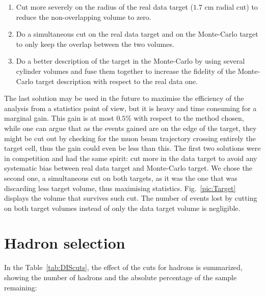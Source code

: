 \begin{enumerate}
  \item Cut more severely on the radius of the real data target ($1.7$ cm radial cut) to reduce the non-overlapping volume to zero.
  \item Do a simultaneous cut on the real data target and on the Monte-Carlo target to only keep the overlap between the two volumes.
  \item Do a better description of the target in the Monte-Carlo by using several cylinder volumes and fuse them together to increase the fidelity of the Monte-Carlo target description with respect to the real data one.
\end{enumerate}

The last solution may be used in the future to maximise the efficiency of the analysis from a statistics point of view, but it is heavy and time consuming for a marginal gain. This gain is at most $0.5$\% with respect to the method chosen, while one can argue that as the events gained are on the edge of the target, they might be cut out by checking for the muon beam trajectory crossing entirely the target cell, thus the gain could even be less than this.
The first two solutions were in competition and had the same spirit: cut more in the data target to avoid any systematic bias between real data target and Monte-Carlo target. We chose the second one, a simultaneous cut on both targets, as it was the one that was discarding less target volume, thus maximising statistics. Fig.~\ref{pic:Target} displays the volume that survives such cut. The number of events lost by cutting on both target volumes instead of only the data target volume is negligible.


\section{Hadron selection}\label{sec:hadsel}

In the Table~\ref{tab:DIScuts}, the effect of the cuts for hadrons is summarized, showing the number of hadrons and the absolute percentage of the sample remaining:

